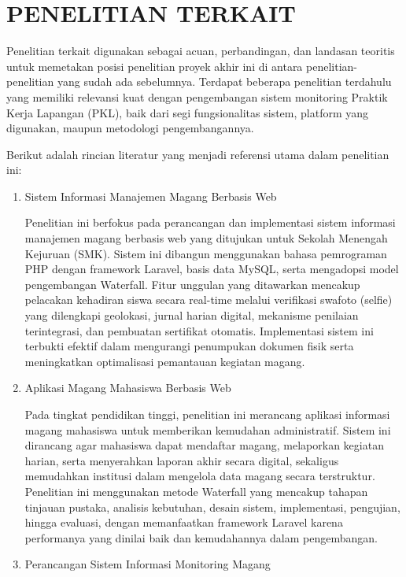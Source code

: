\section{PENELITIAN TERKAIT}

Penelitian terkait digunakan sebagai acuan, perbandingan, dan landasan teoritis untuk memetakan posisi penelitian proyek akhir ini di antara penelitian-penelitian yang sudah ada sebelumnya. Terdapat beberapa penelitian terdahulu yang memiliki relevansi kuat dengan pengembangan sistem monitoring Praktik Kerja Lapangan (PKL), baik dari segi fungsionalitas sistem, platform yang digunakan, maupun metodologi pengembangannya.

Berikut adalah rincian literatur yang menjadi referensi utama dalam penelitian ini:

\begin{enumerate}[label=\arabic*.]
\item Sistem Informasi Manajemen Magang Berbasis Web \cite{ref4}
\par\noindent Penelitian ini berfokus pada perancangan dan implementasi sistem informasi manajemen magang berbasis web yang ditujukan untuk Sekolah Menengah Kejuruan (SMK). Sistem ini dibangun menggunakan bahasa pemrograman PHP dengan framework Laravel, basis data MySQL, serta mengadopsi model pengembangan Waterfall. Fitur unggulan yang ditawarkan mencakup pelacakan kehadiran siswa secara real-time melalui verifikasi swafoto (selfie) yang dilengkapi geolokasi, jurnal harian digital, mekanisme penilaian terintegrasi, dan pembuatan sertifikat otomatis. Implementasi sistem ini terbukti efektif dalam mengurangi penumpukan dokumen fisik serta meningkatkan optimalisasi pemantauan kegiatan magang.
\item Aplikasi Magang Mahasiswa Berbasis Web \cite{ref5}
\par\noindent Pada tingkat pendidikan tinggi, penelitian ini merancang aplikasi informasi magang mahasiswa untuk memberikan kemudahan administratif. Sistem ini dirancang agar mahasiswa dapat mendaftar magang, melaporkan kegiatan harian, serta menyerahkan laporan akhir secara digital, sekaligus memudahkan institusi dalam mengelola data magang secara terstruktur. Penelitian ini menggunakan metode Waterfall yang mencakup tahapan tinjauan pustaka, analisis kebutuhan, desain sistem, implementasi, pengujian, hingga evaluasi, dengan memanfaatkan framework Laravel karena performanya yang dinilai baik dan kemudahannya dalam pengembangan.
\item Perancangan Sistem Informasi Monitoring Magang \cite{ref6}

\end{enumerate}
